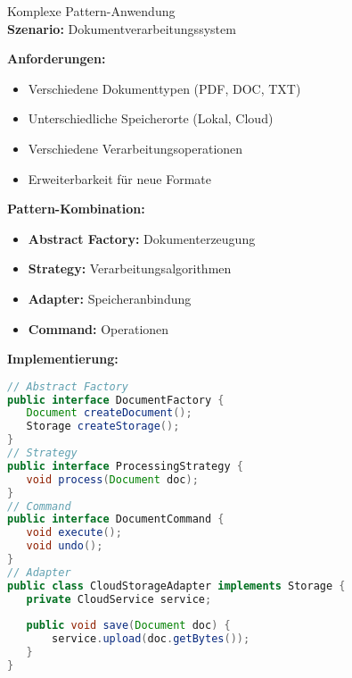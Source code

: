 \begin{example2}{Komplexe Pattern-Anwendung}\\
\textbf{Szenario:} Dokumentverarbeitungssystem

\textbf{Anforderungen:}
\begin{itemize}
   \item Verschiedene Dokumenttypen (PDF, DOC, TXT)
   \item Unterschiedliche Speicherorte (Lokal, Cloud)
   \item Verschiedene Verarbeitungsoperationen
   \item Erweiterbarkeit für neue Formate
\end{itemize}

\textbf{Pattern-Kombination:}
\begin{itemize}
   \item \textbf{Abstract Factory:} Dokumenterzeugung
   \item \textbf{Strategy:} Verarbeitungsalgorithmen
   \item \textbf{Adapter:} Speicheranbindung
   \item \textbf{Command:} Operationen
\end{itemize}

\textbf{Implementierung:}
\begin{lstlisting}[language=Java, style=basesmol]
// Abstract Factory
public interface DocumentFactory {
   Document createDocument();
   Storage createStorage();
}
// Strategy
public interface ProcessingStrategy {
   void process(Document doc);
}
// Command
public interface DocumentCommand {
   void execute();
   void undo();
}
// Adapter
public class CloudStorageAdapter implements Storage {
   private CloudService service;
   
   public void save(Document doc) {
       service.upload(doc.getBytes());
   }
}
\end{lstlisting}
\end{example2}

